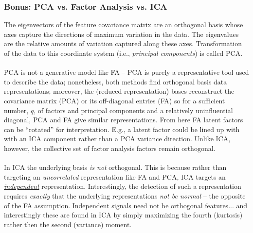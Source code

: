\documentclass[xcolor={dvipsnames}]{beamer}
\begin{document}
\frame
{
 \frametitle{Bonus: PCA vs. Factor Analysis vs. ICA}
 
 \footnotesize
 
 
The eigenvectors of the feature covariance matrix are an orthogonal basis whose axes capture the directions of maximum variation in the data. The eigenvalues are the relative amounts of variation captured along these axes. Transformation of the data to this coordinate system (i.e., \emph{principal components}) is called PCA.\\${}$\\

PCA is not a generative model like FA -- PCA is purely a representative tool used to describe the data; nonetheless, both methods find orthogonal basis data representations; moreover, the (reduced representation) bases reconstruct the covariance matrix (PCA) or its off-diagonal entries (FA) so for a sufficient number, $q$, of factors and principal components and a relatively uninfluential diagonal,  
 PCA and FA give similar representations.
From here FA latent factors can be ``rotated'' for interpretation. E.g., a latent factor could be lined up with with an ICA component rather than a PCA variance direction.
Unlike ICA, however, the collective set of factor analysis factors remain orthogonal.\\${}$\\

In ICA the underlying basis \emph{is not} orthogonal. This is because rather than targeting an \emph{uncorrelated} representation like FA and PCA, ICA targets an \underline{\emph{independent}} representation. Interestingly, the detection of such a representation requires \emph{exactly} that the underlying representations \emph{not be normal} -- the opposite of the FA assumption.  Independent signals need not be orthogonal features... and interestingly these are found in ICA by simply maximizing the fourth (kurtosis) rather then the second (variance) moment.
\\${}$\\


}
\end{document}
